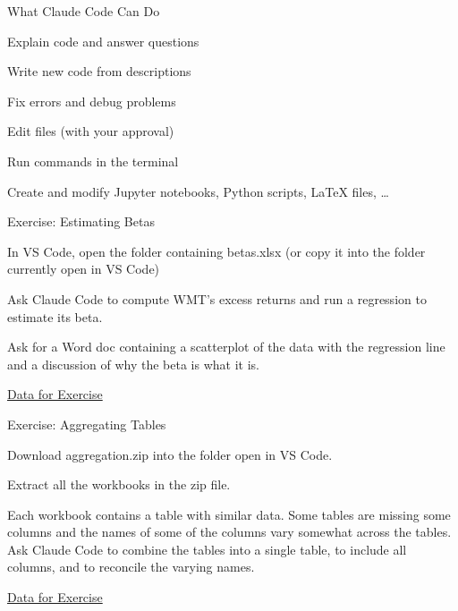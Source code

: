 \documentclass[aspectratio=169]{beamer}
\begin{document}
\begin{frame}{What Claude Code Can Do}
\begin{baritemize}
  \item Explain code and answer questions
  \item Write new code from descriptions
  \item Fix errors and debug problems
  \item Edit files (with your approval)
  \item \alert{Run commands in the terminal}
  \item Create and modify Jupyter notebooks, Python scripts, LaTeX files, \ldots
\end{baritemize}
\end{frame}


\begin{frame}{Exercise: Estimating Betas}
\begin{baritemize}
\item In VS Code, open the folder containing betas.xlsx (or copy it into the folder currently open in VS Code)
\item  Ask Claude Code to compute WMT's excess returns and run a regression to estimate its beta.  
\item Ask for a Word doc containing a scatterplot of the data with the regression line and a discussion of why the beta is what it is.
\end{baritemize}

\begin{center}
\begin{shadedbox}[width=0.7\textwidth]
\centering\href{https://kerryback.com/mgmt675/files/betas.xlsx}{Data for Exercise}
\end{shadedbox}
\end{center}
\end{frame}

\begin{frame}{Exercise: Aggregating Tables}
\begin{baritemize}
\item Download aggregation.zip into the folder open in VS Code.
\item Extract all the workbooks in the zip file.
\item Each workbook contains a table with similar data.  Some tables are missing some columns and the names of some of the columns vary somewhat across the tables.  Ask Claude Code to combine the tables into a single table, to include all columns, and to reconcile the varying names.
\end{baritemize}

\begin{center}
\begin{shadedbox}[width=0.7\textwidth]
\centering\href{https://kerryback.com/mgmt675/files/aggregation.zip}{Data for Exercise}
\end{shadedbox}
\end{center}
\end{frame}
\end{document}
